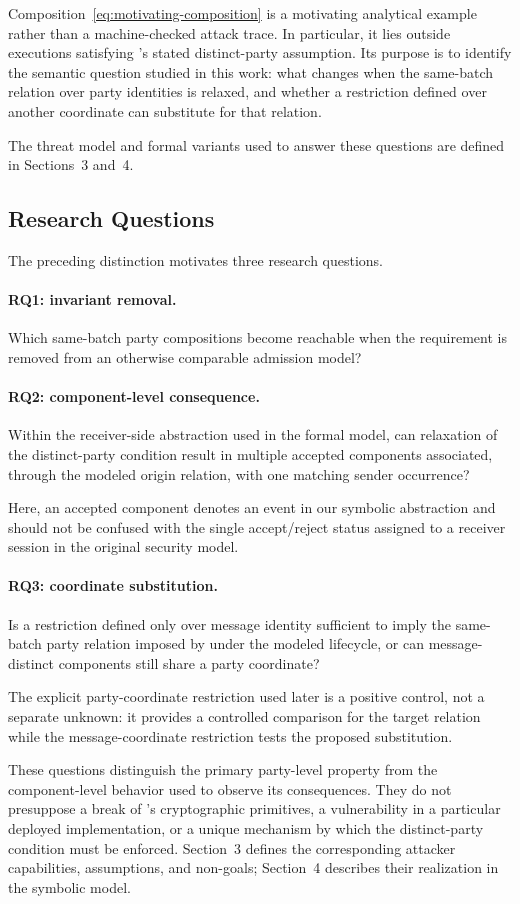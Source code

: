 Composition~\eqref{eq:motivating-composition} is a motivating analytical
example rather than a machine-checked attack trace. In particular, it lies
outside executions satisfying \kwaay's stated distinct-party assumption.
Its purpose is to identify the semantic question studied in this work: what
changes when the same-batch relation over party identities is relaxed, and
whether a restriction defined over another coordinate can substitute for that
relation.

The threat model and formal variants used to answer these questions are
defined in Sections~3 and~4.

\subsection{Research Questions}

The preceding distinction motivates three research questions.

\paragraph{RQ1: invariant removal.}
Which same-batch party compositions become reachable when the
\distinctparty requirement is removed from an otherwise comparable admission
model?

\paragraph{RQ2: component-level consequence.}
Within the receiver-side abstraction used in the formal model, can relaxation
of the distinct-party condition result in multiple accepted components
associated, through the modeled origin relation, with one matching sender
occurrence?

Here, an accepted component denotes an event in our symbolic abstraction and
should not be confused with the single accept/reject status assigned to a
receiver session in the original \kwaay security model.

\paragraph{RQ3: coordinate substitution.}
Is a restriction defined only over message identity sufficient to imply the
same-batch party relation imposed by \distinctparty under the modeled
lifecycle, or can message-distinct components still share a party coordinate?

The explicit party-coordinate restriction used later is a positive control,
not a separate unknown: it provides a controlled comparison for the target
relation while the message-coordinate restriction tests the proposed
substitution.

These questions distinguish the primary party-level property from the
component-level behavior used to observe its consequences. They do not
presuppose a break of \kwaay's cryptographic primitives, a vulnerability in a
particular deployed implementation, or a unique mechanism by which the
distinct-party condition must be enforced. Section~3 defines the corresponding
attacker capabilities, assumptions, and non-goals; Section~4 describes their
realization in the symbolic model.
